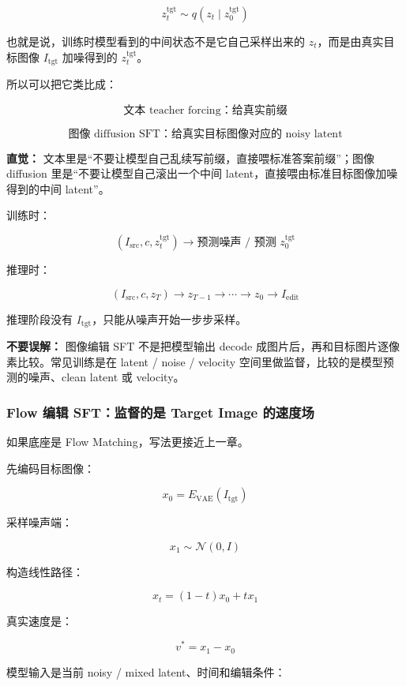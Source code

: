 \[
z_t^\text{tgt}
\sim
q(z_t\mid z_0^\text{tgt})
\]

也就是说，训练时模型看到的中间状态不是它自己采样出来的 $z_t$，而是由真实目标图像 $I_\text{tgt}$ 加噪得到的 $z_t^\text{tgt}$。

所以可以把它类比成：

\[
\text{文本 teacher forcing：给真实前缀}
\]

\[
\text{图像 diffusion SFT：给真实目标图像对应的 noisy latent}
\]

\begin{intubox}
\textbf{直觉：} 文本里是“不要让模型自己乱续写前缀，直接喂标准答案前缀”；图像 diffusion 里是“不要让模型自己滚出一个中间 latent，直接喂由标准目标图像加噪得到的中间 latent”。
\end{intubox}

训练时：

\[
\left(
I_\text{src},
c,
z_t^\text{tgt}
\right)
\longrightarrow
\text{预测噪声 / 预测 } z_0^\text{tgt}
\]

推理时：

\[
\left(
I_\text{src},
c,
z_T
\right)
\longrightarrow
z_{T-1}
\longrightarrow
\cdots
\longrightarrow
z_0
\longrightarrow
I_\text{edit}
\]

推理阶段没有 $I_\text{tgt}$，只能从噪声开始一步步采样。

\begin{warnbox}
\textbf{不要误解：} 图像编辑 SFT 不是把模型输出 decode 成图片后，再和目标图片逐像素比较。常见训练是在 latent / noise / velocity 空间里做监督，比较的是模型预测的噪声、clean latent 或 velocity。
\end{warnbox}

\subsubsection{Flow 编辑 SFT：监督的是 Target Image 的速度场}

如果底座是 Flow Matching，写法更接近上一章。

先编码目标图像：

\[
x_0
=
E_\text{VAE}(I_\text{tgt})
\]

采样噪声端：

\[
x_1\sim\mathcal{N}(0,I)
\]

构造线性路径：

\[
x_t
=
(1-t)x_0 + t x_1
\]

真实速度是：

\[
v^*
=
x_1-x_0
\]

模型输入是当前 noisy / mixed latent、时间和编辑条件：

